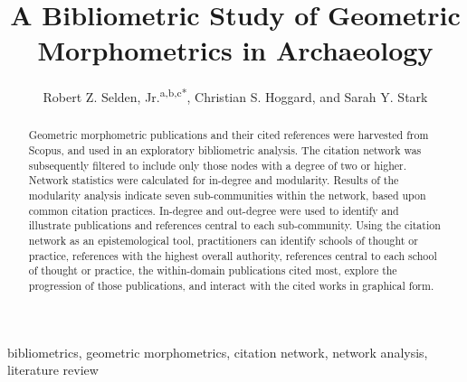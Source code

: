 \documentclass[review]{elsarticle}
\begin{document}
\begin{frontmatter}

\title{A Bibliometric Study of Geometric Morphometrics in Archaeology}

\author{Robert Z. Selden, Jr.\textsuperscript{a,b,c*}, Christian S. Hoggard\textsuperscript{}, and Sarah Y. Stark\textsuperscript{}}
\address[1]{Heritage Research Center, Stephen F. Austin State University, United States}
\address[2]{Cultural Heritage Department, Jean Monnet University, France}
\address[3]{ORCID ID \href{http://orcid.org/0000-0002-1789-8449}{0000-0002-1789-8449}}

\begin{abstract}
Geometric morphometric publications and their cited references were harvested from Scopus, and used in an exploratory bibliometric analysis. The citation network was subsequently filtered to include only those nodes with a degree of two or higher. Network statistics were calculated for in-degree and modularity. Results of the modularity analysis indicate seven sub-communities within the network, based upon common citation practices. In-degree and out-degree were used to identify and illustrate publications and references central to each sub-community. Using the citation network as an epistemological tool, practitioners can identify schools of thought or practice, references with the highest overall authority, references central to each school of thought or practice, the within-domain publications cited most, explore the progression of those publications, and interact with the cited works in graphical form.
\end{abstract}

\begin{keyword}
bibliometrics, geometric morphometrics, citation network, network analysis, literature review
\end{keyword}

\end{frontmatter}

\linenumbers

\section*{}




\end{document}
